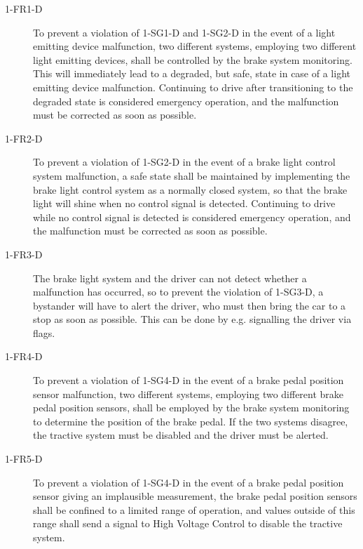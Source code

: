 \begin{description}
\item [1-FR1-D] To prevent a violation of 1-SG1-D and 1-SG2-D in the event of a light emitting device malfunction, two different systems, employing two different light emitting devices, shall be controlled by the brake system monitoring.
This will immediately lead to a degraded, but safe, state in case of a light emitting device malfunction.
Continuing to drive after transitioning to the degraded state is considered emergency operation, and the malfunction must be corrected as soon as possible.

\item [1-FR2-D] To prevent a violation of 1-SG2-D in the event of a brake light control system malfunction, a safe state shall be maintained by implementing the brake light control system as a normally closed system, so that the brake light will shine when no control signal is detected.
Continuing to drive while no control signal is detected is considered emergency operation, and the malfunction must be corrected as soon as possible.

\item [1-FR3-D] The brake light system and the driver can not detect whether a malfunction has occurred, so to prevent the violation of 1-SG3-D, a bystander will have to alert the driver, who must then bring the car to a stop as soon as possible.
This can be done by e.g. signalling the driver via flags.

\item [1-FR4-D] To prevent a violation of 1-SG4-D in the event of a brake pedal position sensor malfunction, two different systems, employing two different brake pedal position sensors, shall be employed by the brake system monitoring to determine the position of the brake pedal.
If the two systems disagree, the tractive system must be disabled and the driver must be alerted.

\item [1-FR5-D] To prevent a violation of 1-SG4-D in the event of a brake pedal position sensor giving an implausible measurement, the brake pedal position sensors shall be confined to a limited range of operation, and values outside of this range shall send a signal to High Voltage Control to disable the tractive system.
\end{description}

